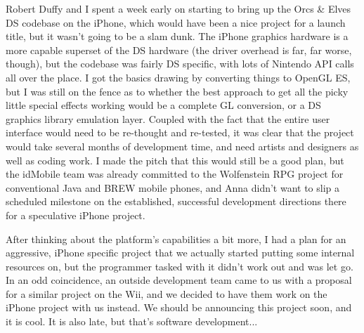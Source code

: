 \documentclass[book.tex]{subfiles}
\begin{document}
Robert Duffy and I spent a week early on starting to bring up the Orcs \& Elves DS codebase on the iPhone, which would have been a nice project for a launch title, but it wasn't going to be a slam dunk.  The iPhone graphics hardware is a more capable superset of the DS hardware (the driver overhead is far, far worse, though), but the codebase was fairly DS specific, with lots of Nintendo API calls all over the place.  I got the basics drawing by converting things to OpenGL ES, but I was still on the fence as to whether the best approach to get all the picky little special effects working would be a complete GL conversion, or a DS graphics library emulation layer.  Coupled with the fact that the entire user interface would need to be re-thought and re-tested, it was clear that the project would take several months of development time, and need artists and designers as well as coding work.  I made the pitch that this would still be a good plan, but the idMobile team was already committed to the Wolfenstein RPG project for conventional Java and BREW mobile phones, and Anna didn't want to slip a scheduled milestone on the established, successful development directions there for a speculative iPhone project.\\
\par

After thinking about the platform's capabilities a bit more, I had a plan for an aggressive, iPhone specific project that we actually started putting some internal resources on, but the programmer tasked with it didn't work out and was let go.  In an odd coincidence, an outside development team came to us with a proposal for a similar project on the Wii, and we decided to have them work on the iPhone project with us instead.  We should be announcing this project soon, and it is cool.  It is also late, but that's software development...\\
\par
\end{document}
